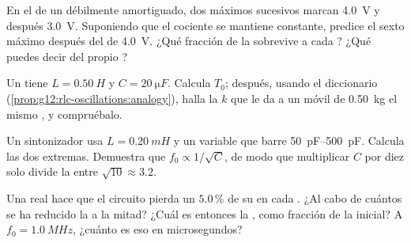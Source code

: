 \begin{exercise}[$\star\star$]\label{exo:g12:rlc-oscillations:10}
En el  de un  débilmente amortiguado, dos máximos sucesivos
marcan \qty{4.0}{V} y después \qty{3.0}{V}. Suponiendo que el cociente se mantiene
constante, predice el sexto máximo después del de \qty{4.0}{V}. ¿Qué fracción de la
\emph{} sobrevive a cada ? ¿Qué puedes decir del propio
?
\end{exercise}

\begin{exercise}[$\star\star$]\label{exo:g12:rlc-oscillations:11}
Un  tiene $L = \qty{0.50}{H}$ y $C = \qty{20}{\micro F}$. Calcula $T_0$;
después, usando el diccionario (\cref{prop:g12:rlc-oscillations:analogy}), halla la
 $k$ que le da a un móvil de \qty{0.50}{kg} el mismo , y
compruébalo.
\end{exercise}

\begin{exercise}[$\star\star\star$]\label{exo:g12:rlc-oscillations:12}
Un sintonizador usa $L = \qty{0.20}{mH}$ y un  variable que barre
\qtyrange{50}{500}{pF}. Calcula las dos  extremas. Demuestra que
$f_0 \propto 1/\sqrt{C}$, de modo que multiplicar $C$ por diez solo divide la
 entre $\sqrt{10} \approx 3.2$.
\end{exercise}

\begin{exercise}[$\star\star\star$]\label{exo:g12:rlc-oscillations:13}
Una  real hace que el circuito pierda un $5.0\,\%$ de su  en cada
. ¿Al cabo de cuántos  se ha reducido la  a la mitad? ¿Cuál
es entonces la , como fracción de la inicial? A $f_0 = \qty{1.0}{MHz}$,
¿cuánto es eso en microsegundos?
\end{exercise}

